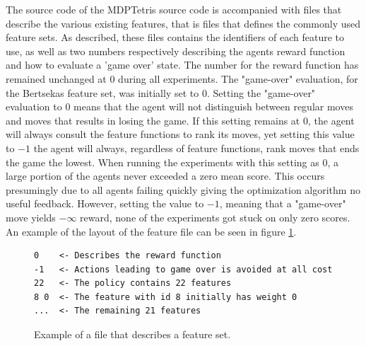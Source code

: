 The source code of the MDPTetris source code 
is accompanied with files that describe the
various existing features, that is files that defines 
the commonly used feature sets. As described, these files contains the identifiers of 
each feature to use, as well as two numbers respectively describing 
the agents reward function and how to evaluate a 'game over' state. 
The number for the reward function has remained unchanged at $0$ 
during all experiments. The "game-over" evaluation, for the
Bertsekas feature set, was initially set to $0$. Setting the 
"game-over" evaluation to $0$ means that the agent will not 
distinguish between regular moves and moves that results in losing
the game. If this setting remains at 0, the agent will always consult the
feature functions to rank its moves, yet setting this value to $-1$
the agent will always, regardless of feature functions, rank moves that ends
the game the lowest.
When running the experiments with this setting as $0$, a large portion
of the agents never exceeded a zero mean score. This occurs presumingly 
due to all agents failing quickly giving the optimization algorithm no 
useful feedback. However, setting the value
to $-1$, meaning that a "game-over" move yields $-\infty$ reward, 
none of the experiments got stuck on only zero scores. An example
of the layout of the feature file can be seen in figure \ref{fig:featfile}.
\begin{figure}[H]
\centering
\begin{lstlisting}
0    <- Describes the reward function
-1   <- Actions leading to game over is avoided at all cost
22   <- The policy contains 22 features
8 0  <- The feature with id 8 initially has weight 0
...  <- The remaining 21 features
\end{lstlisting}
\caption{Example of a file that describes a feature set. \label{fig:featfile}}
\end{figure}

